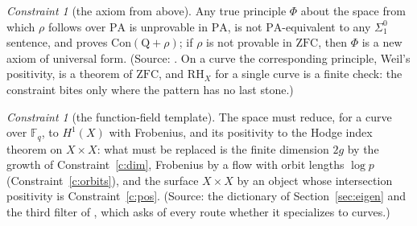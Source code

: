 \documentclass[11pt]{article}
\theoremstyle{definition}
\theoremstyle{remark}
\newtheorem{constraint}[theorem]{Constraint}
\newcommand{\F}{\mathbb F}
\newcommand{\PA}{\mathrm{PA}}
\newcommand{\ZFC}{\mathrm{ZFC}}
\newcommand{\Con}{\mathrm{Con}}
\begin{document}
\begin{constraint}[the axiom from above]\label{c:godel}
Any true principle $\Phi$ about the space from which $\rho$ follows over $\PA$ is unprovable in $\PA$, is not $\PA$-equivalent to any $\Sigma^0_1$ sentence, and proves $\Con(\mathrm Q+\rho)$; if $\rho$ is not provable in $\ZFC$, then $\Phi$ is a new axiom of universal form. (Source: \cite[Thm.\ 6.1, Thm.\ 10.2]{gstring}. On a curve the corresponding principle, Weil's positivity, is a theorem of $\ZFC$, and $\mathrm{RH}_X$ for a single curve is a finite check: the constraint bites only where the pattern has no last stone.)
\end{constraint}

\begin{constraint}[the function-field template]\label{c:template}
The space must reduce, for a curve over $\F_q$, to $H^1(X)$ with Frobenius, and its positivity to the Hodge index theorem on $X\times X$: what must be replaced is the finite dimension $2g$ by the growth of Constraint~\ref{c:dim}, Frobenius by a flow with orbit lengths $\log p$ (Constraint~\ref{c:orbits}), and the surface $X\times X$ by an object whose intersection positivity is Constraint~\ref{c:pos}. (Source: the dictionary of Section~\ref{sec:eigen} and the third filter of \cite{routes}, which asks of every route whether it specializes to curves.)
\end{constraint}
\end{document}
